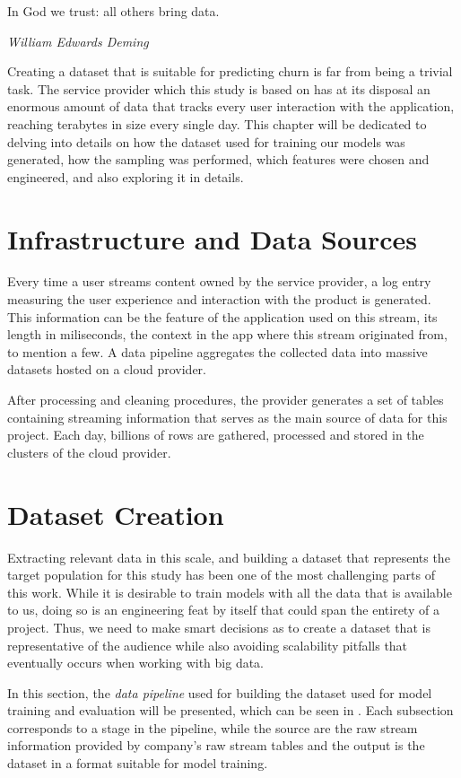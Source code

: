 \documentclass{kththesis}
\begin{document}
\epigraph{In God we trust: all others bring data.}{\textit{William Edwards Deming}}

Creating a dataset that is suitable for predicting churn is far from being a trivial task. The service provider which this study is based on has at its disposal an enormous amount of data that tracks every user interaction with the application, reaching terabytes in size every single day. This chapter will be dedicated to delving into details on how the dataset used for training our models was generated, how the sampling was performed, which features were chosen and engineered, and also exploring it in details.

\section{Infrastructure and Data Sources}

Every time a user streams content owned by the service provider, a log entry measuring the user experience and interaction with the product is generated. This information can be the feature of the application used on this stream, its length in miliseconds, the context in the app where this stream originated from, to mention a few. A data pipeline aggregates the collected data into massive datasets hosted on a cloud provider. 

After processing and cleaning procedures, the provider generates a set of tables containing streaming information that serves as the main source of data for this project. Each day, billions of rows are gathered, processed and stored in the clusters of the cloud provider.

\section{Dataset Creation}

Extracting relevant data in this scale, and building a dataset that represents the target population for this study has been one of the most challenging parts of this work. While it is desirable to train models with all the data that is available to us, doing so is an engineering feat by itself that could span the entirety of a project. Thus, we need to make smart decisions as to create a dataset that is representative of the audience while also avoiding scalability pitfalls that eventually occurs when working with big data.

In this section, the \emph{data pipeline} used for building the dataset used for model training and evaluation will be presented, which can be seen in . Each subsection corresponds to a stage in the pipeline, while the source are the raw stream information provided by company's raw stream tables and the output is the dataset in a format suitable for model training.
\end{document}
